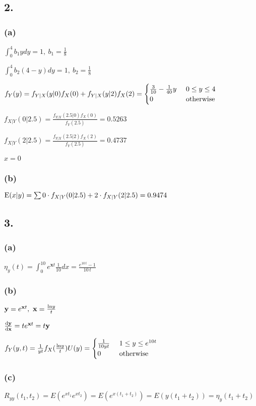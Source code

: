 \documentclass{article}
\begin{document}
\subsection*{2.}
\subsubsection*{(a)}
$\int_{0}^{4}b_{1}ydy=1, \ b_{1}=\frac{1}{8}$\par
$\int_{0}^{4}b_{2}(4-y)dy=1, \ b_{2}=\frac{1}{8}$\par
$f_{Y}(y)=f_{Y|X}(y|0)f_{X}(0)+f_{Y|X}(y|2)f_{X}(2)=\begin{cases}
\frac{3}{10}-\frac{1}{40}y \ &0\leq y \leq 4\\
0 \ &{\rm otherwise}
\end{cases}$\par
$f_{X|Y}(0|2.5)=\frac{f_{Y|X}(2.5|0)f_{X}(0)}{f_{Y}(2.5)}=0.5263$\par
$f_{X|Y}(2|2.5)=\frac{f_{Y|X}(2.5|2)f_{X}(2)}{f_{Y}(2.5)}=0.4737$\par
$\hat{x}=0$
\subsubsection*{(b)}
${\rm E}(x|y)=\sum 0 \cdot f_{X|Y}(0|2.5)+2 \cdot f_{X|Y}(2|2.5)=0.9474$\par
\subsection*{3.}
\subsubsection*{(a)}
$\eta_{y}(t)=\int_{0}^{10}e^{\mathbf{x}t}\frac{1}{10}dx=\frac{{e}^{10\,t}-1}{10\,t}$
\subsubsection*{(b)}
$\mathbf{y}=e^{\mathbf{x}t}, \ \mathbf{x}=\frac{{\rm ln}y}{t}$\par
$\frac{{\rm d}\mathbf{y}}{{\rm d}\mathbf{x}}=te^{\mathbf{x}t}=t\mathbf{y}$\par
$f_{Y}(y,t)=\frac{1}{yt}f_{X}(\frac{{\rm ln}y}{t})U(y)=\begin{cases}
\frac{1}{10yt} \ & 1 \leq y \leq e^{10t}\\
0 \ & {\rm otherwise}
\end{cases}$
\subsubsection*{(c)}
$R_{yy}(t_{1},t_{2})=E(e^{xt_{1}}e^{xt_{2}})=E(e^{x(t_{1}+t_{2})})=E(y(t_{1}+t_{2}))=\eta_{y}(t_{1}+t_{2})$
\end{document}
